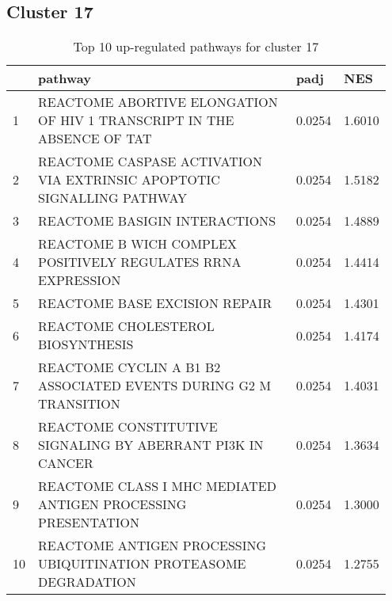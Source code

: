 \documentclass{article}
\begin{document}
\subsection{Cluster 17 }
\begin{table}[H]
\centering
\begin{tabular}{p{0.05\linewidth}p{0.7\linewidth}p{0.1\linewidth}p{0.1\linewidth}}
  \hline
 & pathway & padj & NES \\ 
  \hline
1 & REACTOME ABORTIVE ELONGATION OF HIV 1 TRANSCRIPT IN THE ABSENCE OF TAT & 0.0254 & 1.6010 \\ 
  2 & REACTOME CASPASE ACTIVATION VIA EXTRINSIC APOPTOTIC SIGNALLING PATHWAY & 0.0254 & 1.5182 \\ 
  3 & REACTOME BASIGIN INTERACTIONS & 0.0254 & 1.4889 \\ 
  4 & REACTOME B WICH COMPLEX POSITIVELY REGULATES RRNA EXPRESSION & 0.0254 & 1.4414 \\ 
  5 & REACTOME BASE EXCISION REPAIR & 0.0254 & 1.4301 \\ 
  6 & REACTOME CHOLESTEROL BIOSYNTHESIS & 0.0254 & 1.4174 \\ 
  7 & REACTOME CYCLIN A B1 B2 ASSOCIATED EVENTS DURING G2 M TRANSITION & 0.0254 & 1.4031 \\ 
  8 & REACTOME CONSTITUTIVE SIGNALING BY ABERRANT PI3K IN CANCER & 0.0254 & 1.3634 \\ 
  9 & REACTOME CLASS I MHC MEDIATED ANTIGEN PROCESSING PRESENTATION & 0.0254 & 1.3000 \\ 
  10 & REACTOME ANTIGEN PROCESSING UBIQUITINATION PROTEASOME DEGRADATION & 0.0254 & 1.2755 \\ 
   \hline
\end{tabular}
\caption{Top 10 up-regulated pathways for cluster 17} 
\label{tab:q3_2_17}
\end{table}
\end{document}
